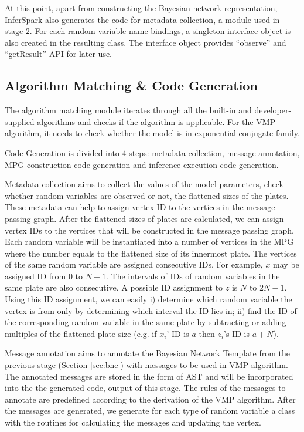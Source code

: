At this point, apart from constructing the Bayesian network representation, 
InferSpark also generates the code for metadata collection, a module used in 
stage 2. For each random variable name bindings, a singleton interface object 
is also created in the resulting class. 
The interface object provides ``{\sf observe}'' and ``{\sf getResult}'' API for later use.

\subsection{Algorithm Matching \& Code Generation}

The algorithm matching module iterates through all the built-in and
developer-supplied algorithms and checks if the algorithm is applicable.  For
the VMP algorithm, it needs to check whether the model is in
exponential-conjugate family. 

Code Generation is divided into 4 steps: metadata
collection, message annotation, MPG construction code generation and inference
execution code generation.

Metadata collection aims to collect the values of the model parameters,
check whether random variables are observed or not, the flattened sizes of the plates.
These metadata can help to 
assign vertex ID to the vertices in the message passing graph.  
After the flattened sizes of plates are calculated, we can assign vertex IDs to the
vertices that will be constructed in the message passing graph. Each random
variable will be instantiated into a number of vertices in the MPG where the
number equals to the flattened size of its innermost plate. The vertices
of the same random variable are assigned consecutive IDs. For example, $x$ may
be assigned ID from $0$ to $N-1$. The intervals of IDs of random variables in
the same plate are also consecutive. A possible ID assignment to $z$ is $N$ to
$2N - 1$. Using this ID assignment, we can easily i) determine which random
variable the vertex is from only by determining which interval the ID lies
in; ii) find the ID of the corresponding random variable in the same plate by
subtracting or adding multiples of the flattened plate size (e.g. if $x_i$' ID is
$a$ then $z_i$'s ID is $a + N$).

Message annotation aims to annotate the Bayesian Network Template from the previous stage (Section \ref{sec:bnc})
with messages
to be used in VMP algorithm.  The annotated messages are stored in the form of
AST and will be incorporated into the the generated code, output of this stage. 
The rules of the messages to annotate are predefined according to the
derivation of the VMP algorithm.
After the messages are generated, we
generate for each type of random variable a class with the routines for
calculating the messages and updating the vertex. 

